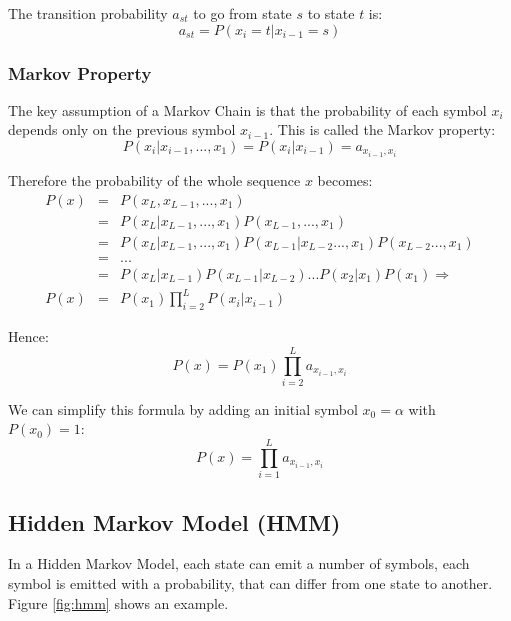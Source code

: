 The transition probability $a_{st}$ to go from state $s$ to state $t$ is:
\begin{equation}
\boxed{a_{st} = P(x_i=t | x_{i-1}=s)}
\end{equation}

\subsubsection{Markov Property}

The key assumption of a Markov Chain is that the probability of each symbol $x_i$ depends only on the previous symbol $x_{i-1}$. This is called the Markov property:
\begin{equation}
\boxed{P(x_i | x_{i-1}, ..., x_1) = P(x_i | x_{i-1})  = a_{x_{i-1},x_i}}
\label{eq:markovproperty}
\end{equation}

Therefore the probability of the whole sequence $x$ becomes:
\begin{eqnarray}
P(x) & = & P(x_L, x_{L-1}, ..., x_1) \nonumber \\
     & = & P(x_L| x_{L-1}, ..., x_1) P(x_{L-1}, ..., x_1)  \nonumber \\
     & = & P(x_L| x_{L-1}, ..., x_1) P(x_{L-1} | x_{L-2} ..., x_1) P(x_{L-2} ..., x_1)
            \nonumber \\
     & = & ...  \nonumber \\
     & = & P(x_L| x_{L-1}) P(x_{L-1} | x_{L-2}) ... P(x_2 | x_1) P(x_1) \Rightarrow 
            \nonumber \\
P(x) & = & P(x_1) \prod_{i=2}^L P(x_i| x_{i-1})
\end{eqnarray}

Hence:
\begin{equation}
\boxed{P(x) = P(x_1) \prod_{i=2}^L a_{x_{i-1},x_i}}
\end{equation}

We can simplify this formula by adding an initial symbol $x_0=\alpha$ with $P(x_0) = 1$:
\begin{equation}
\boxed{P(x) = \prod_{i=1}^L a_{x_{i-1},x_i}}
\end{equation}

\subsection{Hidden Markov Model (HMM)}

In a Hidden Markov Model, each state can emit a number of symbols, each symbol is emitted with a probability, that can differ from one state to another. Figure \ref{fig:hmm} shows an example.

